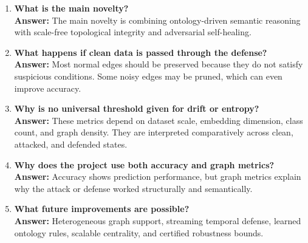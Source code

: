 \documentclass[12pt,a4paper]{article}
\begin{document}
\begin{enumerate}[label=\textbf{Q\arabic*.},resume]
    \item \textbf{What is the main novelty?}\\
    \textbf{Answer:} The main novelty is combining ontology-driven semantic reasoning with scale-free topological integrity and adversarial self-healing.

    \item \textbf{What happens if clean data is passed through the defense?}\\
    \textbf{Answer:} Most normal edges should be preserved because they do not satisfy suspicious conditions. Some noisy edges may be pruned, which can even improve accuracy.

    \item \textbf{Why is no universal threshold given for drift or entropy?}\\
    \textbf{Answer:} These metrics depend on dataset scale, embedding dimension, class count, and graph density. They are interpreted comparatively across clean, attacked, and defended states.

    \item \textbf{Why does the project use both accuracy and graph metrics?}\\
    \textbf{Answer:} Accuracy shows prediction performance, but graph metrics explain why the attack or defense worked structurally and semantically.

    \item \textbf{What future improvements are possible?}\\
    \textbf{Answer:} Heterogeneous graph support, streaming temporal defense, learned ontology rules, scalable centrality, and certified robustness bounds.
\end{enumerate}
\end{document}

